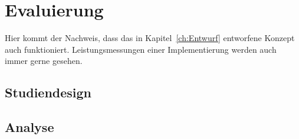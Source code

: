 
\chapter{Evaluierung}
\label{ch:Evaluierung}
Hier kommt der Nachweis, dass das in Kapitel~\ref{ch:Entwurf}
entworfene Konzept auch funktioniert. Leistungsmessungen einer
Implementierung werden auch immer gerne gesehen.


\section{Studiendesign}
\label{ch:Implementierung:sec:Studiendesign}




\section{Analyse}
\label{ch:Evaluierung:sec:Abschnitt1}






